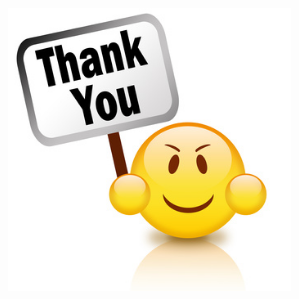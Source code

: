 \documentclass{beamer}
\begin{document}

\fi


\begin{frame}
\begin{figure}
\includegraphics[width=0.7\linewidth, height=7.5cm]{figures/thankyou}
\end{figure}
\end{frame}

\end{document}
